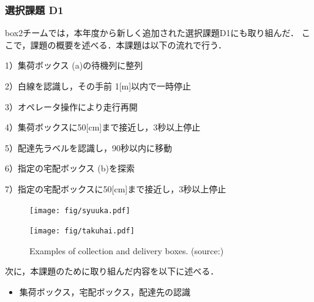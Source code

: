\documentclass[twocolumn, 9pt]{jsproceedings}
\begin{document}
\subsubsection{選択課題 D1}
box2チームでは，本年度から新しく追加された選択課題D1にも取り組んだ．
ここで，課題の概要を述べる．本課題は以下の流れで行う．

\vspace*{1mm}

1）集荷ボックス (a)の待機列に整列

2）白線を認識し，その手前 1[m]以内で一時停止

3）オペレータ操作により走行再開

4）集荷ボックスに50[cm]まで接近し，3秒以上停止

5）配達先ラベルを認識し，90秒以内に移動

6）指定の宅配ボックス (b)を探索

7）指定の宅配ボックスに50[cm]まで接近し，3秒以上停止
\begin{figure}[h!]
  \begin{minipage}[t]{0.47\linewidth}
    \centering
    \texttt{[image: fig/syuuka.pdf]}
    \caption*{\hspace*{3mm}(a) Collection box}
  \end{minipage}
  \hspace*{2mm}
  \begin{minipage}[t]{0.47\linewidth}
    \centering
    \texttt{[image: fig/takuhai.pdf]}
    \caption*{(b) Delivery box}
  \end{minipage}
  \caption{Examples of collection and delivery boxes. (source:\cite{tukuba})}
  \label{fig:hako}
\end{figure}\vspace*{-2mm}
次に，本課題のために取り組んだ内容を以下に述べる．

\begin{itemize}
  \setlength{\leftskip}{-1zw}
  \item 集荷ボックス，宅配ボックス，配達先の認識
\end{itemize}
\vspace*{-2.5mm}
\end{document}
